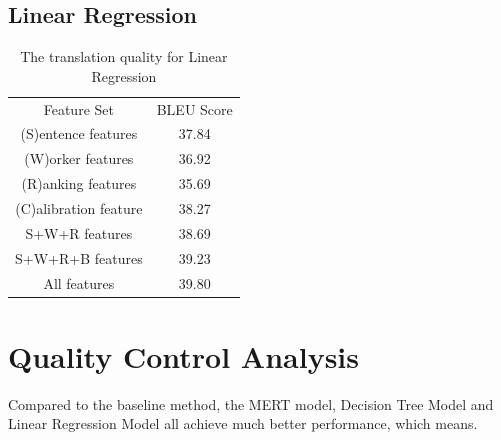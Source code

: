 \subsection{Linear Regression}
\begin{table}[h]
\center
\begin{tabular}{c|c}
\hline
Feature Set           & BLEU Score \\ \hhline{==}
(S)entence features   & 37.84      \\ \hline
(W)orker features     & 36.92     \\ \hline
(R)anking features    & 35.69     \\ \hline
(C)alibration feature & 38.27      \\ \hline
S+W+R features        & 38.69     \\ \hline
S+W+R+B features      & 39.23    \\ \hline
All features          & 39.80     \\ \hline
\end{tabular}
\caption{The translation quality for Linear Regression}
\label{lrbleu}
\end{table}

\section{Quality Control Analysis}
Compared to the baseline method, the MERT model, Decision Tree Model and Linear Regression Model all achieve much better performance, which means.







